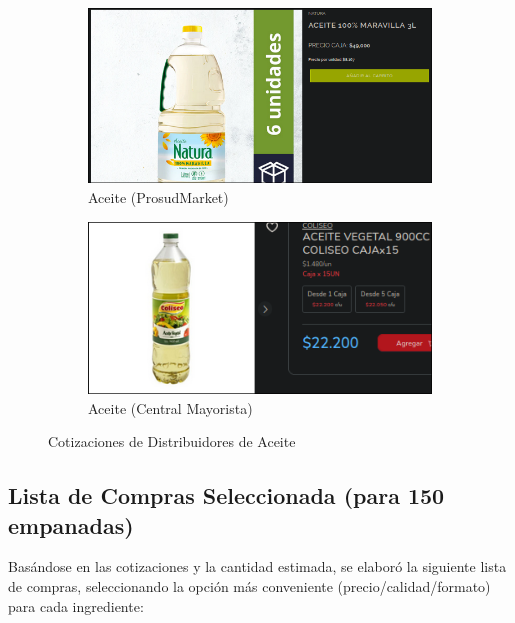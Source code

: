 \documentclass[12pt]{article}
\begin{document}
        \begin{figure}[h!] %
            \centering
            \begin{subfigure}{0.45\textwidth}
                \centering
                \includegraphics[width=0.9\linewidth]{prosud} %
                \caption{Aceite (ProsudMarket)}
                \label{fig:prosudmarket}
            \end{subfigure}
            \hfill
            \begin{subfigure}{0.45\textwidth}
                \centering
                \includegraphics[width=0.9\linewidth]{aceite} %
                \caption{Aceite (Central Mayorista)}
                \label{fig:central_mayorista_aceite}
            \end{subfigure}
            \caption{Cotizaciones de Distribuidores de Aceite}
            \label{fig:cotizaciones_aceite}
        \end{figure} %
\newpage
\subsection{Lista de Compras Seleccionada (para 150 empanadas)}
Basándose en las cotizaciones y la cantidad estimada, se elaboró la siguiente lista de compras, seleccionando la opción más conveniente (precio/calidad/formato) para cada ingrediente:
\end{document}
